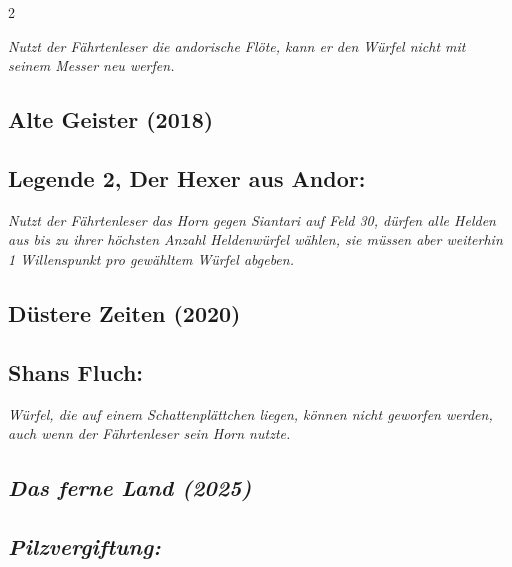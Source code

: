 \documentclass[10pt, a4paper, oneside]{book}
\newcommand{\fan}[1]{\textit{#1}}
\begin{document}
\begin{multicols*}{2}
\begin{bgcolor}
\fan{Nutzt der Fährtenleser die andorische Flöte, kann er den Würfel nicht mit seinem Messer neu werfen.}

\end{bgcolor}






\begin{bgcolor}[color-ag]
\section{Alte Geister (2018)}

\subsection{Legende 2, Der Hexer aus Andor:}

\fan{Nutzt der Fährtenleser das Horn gegen Siantari auf Feld 30, dürfen alle Helden aus bis zu ihrer höchsten Anzahl Heldenwürfel wählen, sie müssen aber weiterhin 1 Willenspunkt pro gewähltem Würfel abgeben.}

\end{bgcolor}




\begin{bgcolor}[color-dz]
\section{Düstere Zeiten (2020)}

\subsection{Shans Fluch:}

\fan{Würfel, die auf einem Schattenplättchen liegen, können nicht geworfen werden, auch wenn der Fährtenleser sein Horn nutzte.}

\end{bgcolor}



\columnbreak


\begin{bgcolor}
\section{\fan{Das ferne Land (2025)}}

\subsection{\fan{Pilzvergiftung:}}


\end{bgcolor}
\end{multicols*}
\end{document}
